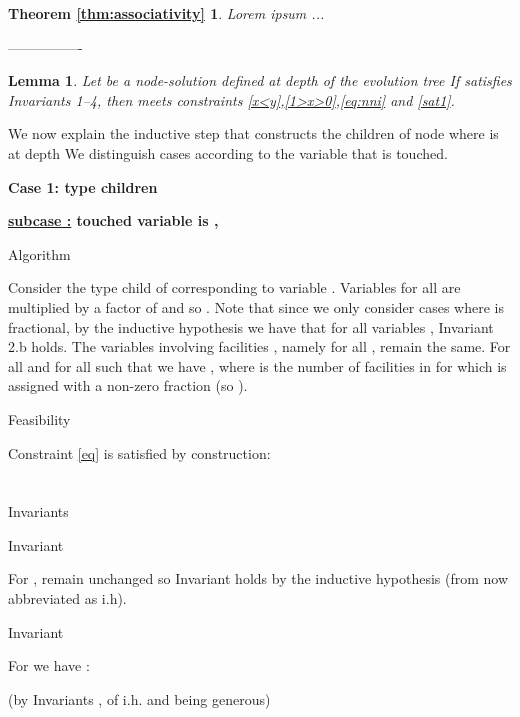 \documentclass[11pt]{article}\usepackage{amsmath}
\newtheorem{lemma}{Lemma}[section]
\begin{document}
\newtheorem*{thm:associativity}{Theorem \ref{thm:associativity}}
\begin{thm:associativity}
Lorem ipsum ...
\end{thm:associativity}

---------------- \fi  





 
\begin{lemma}\label{easyconstraints2}
Let    be a node-solution defined  at   depth   of the evolution tree   If  satisfies
Invariants 1--4, then  meets 
constraints \eqref{x<y},\eqref{1>x>0},\eqref{eq:nni} and \eqref{sat1}.
\end{lemma}





We now explain the  inductive step that constructs the children of
node  where  is at depth  We  distinguish  cases according to the
variable that is touched. 

\medskip
\noindent
{\bf Case 1: type  children}

\noindent 
{\bf \underline{subcase :} touched variable is  , }

{\sc Algorithm}

Consider the type  child  of  corresponding to variable . Variables  for all  are multiplied by a factor of  and so  .
Note that since we only consider cases where  is fractional, by 
the inductive hypothesis we have that for all variables , Invariant 2.b holds.
The variables involving facilities , namely  for all , remain the same.  For all  and for all  such that   we have , where  is
the number of facilities in  for which  is assigned with a non-zero fraction (so ).


{\sc Feasibility}

Constraint \eqref{eq} is satisfied by construction:\\

\noindent
\\
\\

{\sc Invariants}

{\sf Invariant }

For ,  remain unchanged so Invariant  holds by
the inductive hypothesis (from now abbreviated as i.h).

{\sf Invariant }

For  we have :

\noindent
 \hfill  (by Invariants ,  of i.h. and being  generous)\\
\\
\\
\end{document}
